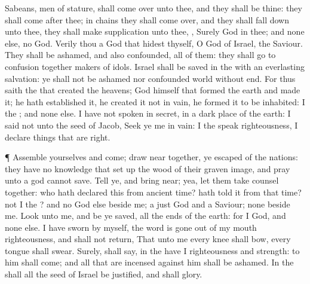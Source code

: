 {Sabeans,
men of
stature, shall come
over unto thee, and they shall be thine: they shall
come
after thee; in
chains they shall come
over, and they shall fall
down unto thee, they shall make
supplication unto thee,
{}, Surely
God
{} in thee; and
{} none else,
{}
no
God.
Verily thou
{} a
God that
hidest thyself, O
God of
Israel, the
Saviour.
They shall be
ashamed, and also
confounded, all of them: they shall
go to
confusion
together
{}
makers of
idols.
Israel shall be
saved in the
{} with an
everlasting
salvation: ye shall not be
ashamed nor
confounded
world without
end.
For thus
saith the
{} that
created the
heavens;
God himself that
formed the
earth and
made it; he hath
established it, he
created it not in
vain, he
formed it to be
inhabited: I
{} the
{}; and
{} none else.
I have not
spoken in
secret, in a
dark
place of the
earth: I
said not unto the
seed of
Jacob,
Seek ye me in
vain: I the
{}
speak
righteousness, I
declare things that are
right.
\par }{\PP {}¶
Assemble yourselves and
come; draw
near
together, ye
{}
escaped of the
nations: they have no
knowledge that set
up the
wood of their graven
image, and
pray unto a
god
{} cannot
save.
Tell ye, and bring
{}
near; yea, let them take
counsel
together: who hath
declared this from ancient
time?
{} hath
told it from that time?
{} not I the
{}? and
{} no
God else
beside me; a
just
God and a
Saviour;
{}
none
beside me.
Look unto me, and be ye
saved, all the
ends of the
earth: for I
{}
God, and
{} none else.
I have
sworn by myself, the
word is gone
out of my
mouth
{}
righteousness, and shall not
return, That unto me every
knee shall
bow, every
tongue shall
swear.
Surely, shall
{}
say, in the
{} have I
righteousness and
strength:
{} to him shall
{}
come; and all that are
incensed against him shall be
ashamed.
In the
{} shall all the
seed of
Israel be
justified, and shall
glory.

}
